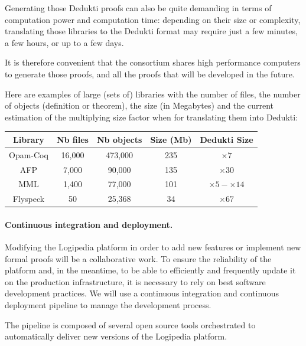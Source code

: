 Generating those Dedukti proofs can also be quite demanding in terms
of computation power and computation time: depending on their size or
complexity, translating those libraries to the Dedukti format may
require just a few minutes, a few hours, or up to a few days.

It is therefore convenient that the consortium shares high performance
computers to generate those proofs, and all the proofs that will
be developed in the future.

Here are examples of large (sets of) libraries with the number of
files, the number of objects (definition or theorem), the size (in
Megabytes) and the current estimation of the multiplying size factor
when for translating them into Dedukti:

\begin{center}
\begin{tabular}{|c|c|c|c|c|}\hline
\rowcolor{color2}Library & Nb files & Nb objects & Size (Mb) & Dedukti Size\\\hline
Opam-Coq & 16,000 & 473,000 & 235 & $\times 7$\\\hline
AFP & 7,000 & 90,000 & 135 & $\times 30$\\\hline
MML & 1,400 & 77,000 & 101 & $\times 5-\times 14$\\\hline
Flyspeck & 50 & 25,368 & 34 & $\times 67$\\\hline
\end{tabular}
\end{center}

\paragraph*{Continuous integration and deployment.}

Modifying the Logipedia platform in order to add new features or
implement new formal proofs will be a collaborative work. To ensure
the reliability of the platform and, in the meantime, to be able to
efficiently and frequently update it on the production infrastructure,
it is necessary to rely on best software development practices.  We
will use a continuous integration and continuous deployment
pipeline to manage the development process.

The pipeline is composed of several open source tools orchestrated
to automatically deliver new versions of the Logipedia platform.

